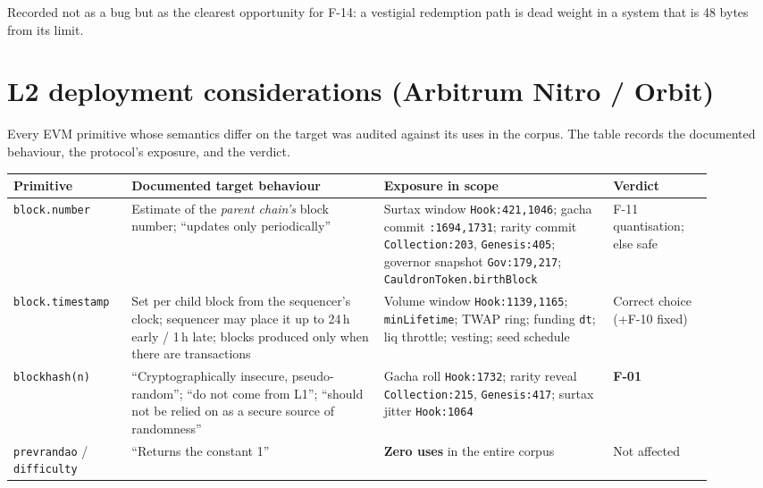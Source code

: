 \documentclass[11pt,a4paper]{article}
\newcommand{\code}[1]{\texttt{\small #1}}
\newcommand{\fileref}[1]{\texttt{\scriptsize #1}}
\begin{document}
Recorded not as a bug but as the clearest opportunity for F-14: a vestigial
redemption path is dead weight in a system that is 48 bytes from its limit.

\newpage
\section{L2 deployment considerations (Arbitrum Nitro / Orbit)}
\label{sec:l2}

Every EVM primitive whose semantics differ on the target was audited against its
uses in the corpus. The table records the documented behaviour, the protocol's
exposure, and the verdict.

\begin{longtable}{@{}p{0.15\linewidth}p{0.33\linewidth}p{0.30\linewidth}p{0.13\linewidth}@{}}
\toprule
\textbf{Primitive} & \textbf{Documented target behaviour} & \textbf{Exposure in scope} & \textbf{Verdict} \\
\midrule\endhead

\code{block.\allowbreak number} &
Estimate of the \emph{parent chain's} block number; ``updates only periodically'' &
Surtax window \fileref{Hook:421,1046}; gacha commit \fileref{:1694,1731}; rarity commit \fileref{Collection:203}, \fileref{Genesis:405}; governor snapshot \fileref{Gov:179,217}; \code{CauldronToken.birthBlock} &
\textcolor{medium}{F-11 quantisation; else safe} \\

\code{block.\allowbreak timestamp} &
Set per child block from the sequencer's clock; sequencer may place it up to 24\,h early / 1\,h late; blocks produced only when there are transactions &
Volume window \fileref{Hook:1139,1165}; \code{minLifetime}; TWAP ring; funding \code{dt}; liq throttle; vesting; seed schedule &
\textcolor{good}{Correct choice} (+F-10 fixed) \\

\code{blockhash(n)} &
``Cryptographically insecure, pseudo-random''; ``do not come from L1''; ``should not be relied on as a secure source of randomness'' &
Gacha roll \fileref{Hook:1732}; rarity reveal \fileref{Collection:215}, \fileref{Genesis:417}; surtax jitter \fileref{Hook:1064} &
\textcolor{high}{\textbf{F-01}} \\

\code{prevrandao} / \code{difficulty} &
``Returns the constant 1'' &
\textbf{Zero uses} in the entire corpus &
\textcolor{good}{Not affected} \\


\end{longtable}
\end{document}
